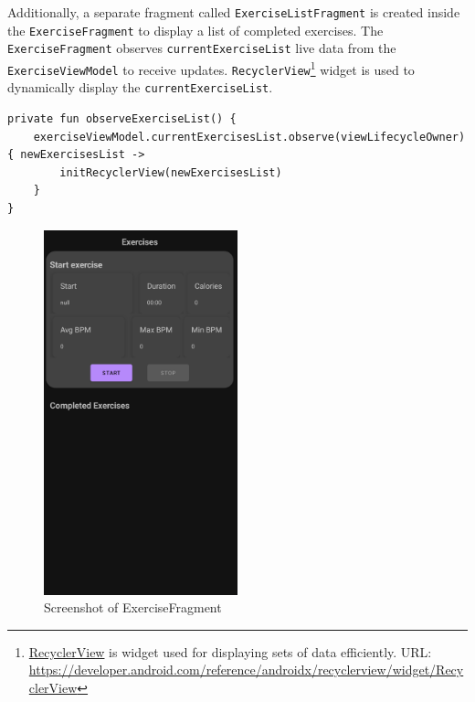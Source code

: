 Additionally, a separate fragment called \texttt{ExerciseListFragment} is created inside the \texttt{ExerciseFragment} to display a list of completed exercises. The \texttt{ExerciseFragment} observes \texttt{currentExerciseList} live data from the \texttt{ExerciseViewModel} to receive updates. 
\texttt{RecyclerView}\footnote{\url{RecyclerView} is widget used for displaying sets of data efficiently. URL: \url{https://developer.android.com/reference/androidx/recyclerview/widget/RecyclerView}} widget is used to dynamically display the \texttt{currentExerciseList}. 
\begin{lstlisting}[caption={Observer for currentExercise (HomeFragment)}]
private fun observeExerciseList() {
    exerciseViewModel.currentExercisesList.observe(viewLifecycleOwner) { newExercisesList ->
        initRecyclerView(newExercisesList)
    }
}
\end{lstlisting}
\begin{figure}[H]
    \centering
    \includegraphics[width=0.5\textwidth]{images/exercisefragment-screenshot.png}
    \caption{Screenshot of ExerciseFragment}
    \label{fig:userfragment_screenshot}
\end{figure}

